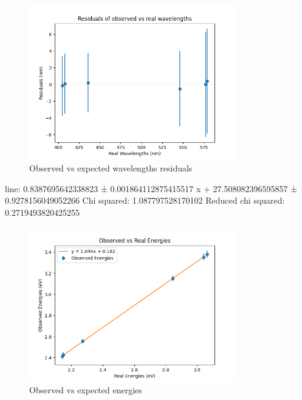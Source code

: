 \begin{figure}[H]
    \centering
    \includegraphics[width=0.8\textwidth]{Results/Sections/Part1/Part1_wavelength_observed_vs_expected_residuals.png}
    \caption{Observed vs expected wavelengths residuals}
    \label{fig:Part1waveU}
\end{figure}

line: 0.8387695642338823 ± 0.001864112875415517 x + 27.508082396595857 ± 0.9278156049052266
Chi squared: 1.087797528170102
Reduced chi squared: 0.2719493820425255



\begin{figure}[H]
    \centering
    \includegraphics[width=0.8\textwidth]{Results/Sections/Part1/Part1_energy_observed_vs_expected.png}
    \caption{Observed vs expected energies}
    \label{fig:Part1energy}
\end{figure}

